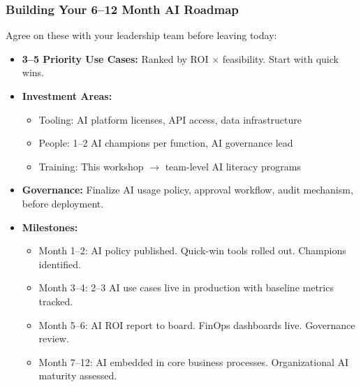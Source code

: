 \begin{frame}[fragile]\frametitle{Building Your 6--12 Month AI Roadmap}

Agree on these with your leadership team before leaving today:
\begin{itemize}
  \item \textbf{3--5 Priority Use Cases:} Ranked by ROI $\times$ feasibility. Start with quick wins.
  \item \textbf{Investment Areas:}
    \begin{itemize}
      \item Tooling: AI platform licenses, API access, data infrastructure
      \item People: 1--2 AI champions per function, AI governance lead
      \item Training: This workshop $\rightarrow$ team-level AI literacy programs
    \end{itemize}
  \item \textbf{Governance:} Finalize AI usage policy, approval workflow, audit mechanism, before deployment.
  \item \textbf{Milestones:}
    \begin{itemize}
      \item Month 1--2: AI policy published. Quick-win tools rolled out. Champions identified.
      \item Month 3--4: 2--3 AI use cases live in production with baseline metrics tracked.
      \item Month 5--6: AI ROI report to board. FinOps dashboards live. Governance review.
      \item Month 7--12: AI embedded in core business processes. Organizational AI maturity assessed.
    \end{itemize}
\end{itemize}

\end{frame}

